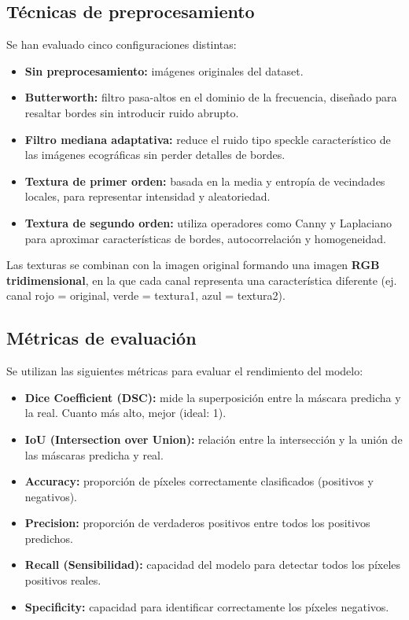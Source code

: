 \documentclass[12pt]{article}
\begin{document}
\subsection{Técnicas de preprocesamiento}
Se han evaluado cinco configuraciones distintas:
\begin{itemize}
    \item \textbf{Sin preprocesamiento:} imágenes originales del dataset.
    \item \textbf{Butterworth:} filtro pasa-altos en el dominio de la frecuencia, diseñado para resaltar bordes sin introducir ruido abrupto.
    \item \textbf{Filtro mediana adaptativa:} reduce el ruido tipo speckle característico de las imágenes ecográficas sin perder detalles de bordes.
    \item \textbf{Textura de primer orden:} basada en la media y entropía de vecindades locales, para representar intensidad y aleatoriedad.
    \item \textbf{Textura de segundo orden:} utiliza operadores como Canny y Laplaciano para aproximar características de bordes, autocorrelación y homogeneidad.
\end{itemize}

Las texturas se combinan con la imagen original formando una imagen \textbf{RGB tridimensional}, en la que cada canal representa una característica diferente (ej. canal rojo = original, verde = textura1, azul = textura2).

\subsection{Métricas de evaluación}
Se utilizan las siguientes métricas para evaluar el rendimiento del modelo:
\begin{itemize}
    \item \textbf{Dice Coefficient (DSC):} mide la superposición entre la máscara predicha y la real. Cuanto más alto, mejor (ideal: 1).
    \item \textbf{IoU (Intersection over Union):} relación entre la intersección y la unión de las máscaras predicha y real.
    \item \textbf{Accuracy:} proporción de píxeles correctamente clasificados (positivos y negativos).
    \item \textbf{Precision:} proporción de verdaderos positivos entre todos los positivos predichos.
    \item \textbf{Recall (Sensibilidad):} capacidad del modelo para detectar todos los píxeles positivos reales.
    \item \textbf{Specificity:} capacidad para identificar correctamente los píxeles negativos.
\end{itemize}
\end{document}
